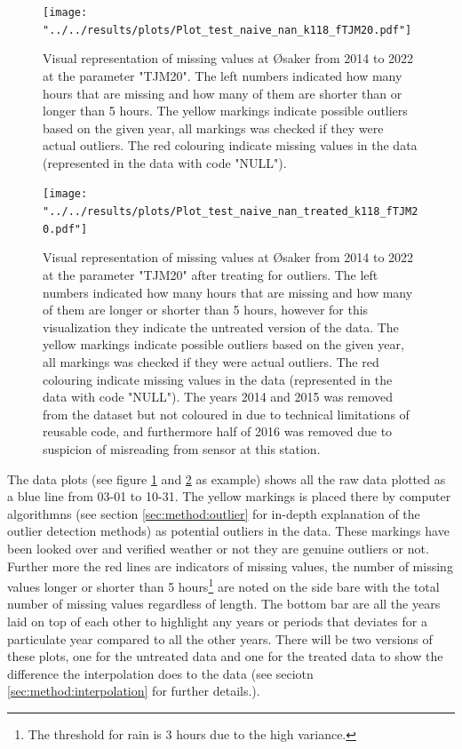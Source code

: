 \begin{figure}
		\centering
		\begin{adjustwidth}{-1in}{-1in}
			\texttt{[image: "../../results/plots/Plot\_test\_naive\_nan\_k118\_fTJM20.pdf"]}
		\end{adjustwidth}
		\caption[Visual representation of Øsaker untreated]{Visual representation of missing values at Øsaker from 2014 to 2022 at the parameter "TJM20". The left numbers indicated how many hours that are missing and how many of them are shorter than or longer than 5 hours. The yellow markings indicate possible outliers based on the given year, all markings was checked if they were actual outliers. The red colouring indicate missing values in the data (represented in the data with code "NULL").}
		\label{fig:plot-17}
\end{figure}
\begin{figure}
		\centering
		\begin{adjustwidth}{-1in}{-1in}
			\texttt{[image: "../../results/plots/Plot\_test\_naive\_nan\_treated\_k118\_fTJM20.pdf"]}
		\end{adjustwidth}
		\caption[Visual representation of Øsaker treated]{Visual representation of missing values at Øsaker from 2014 to 2022 at the parameter "TJM20" after treating for outliers. The left numbers indicated how many hours that are missing and how many of them are longer or shorter than 5 hours, however for this visualization they indicate the untreated version of the data. The yellow markings indicate possible outliers based on the given year, all markings was checked if they were actual outliers. The red colouring indicate missing values in the data (represented in the data with code "NULL"). The years 2014 and 2015 was removed from the dataset but not coloured in due to technical limitations of reusable code, and furthermore half of 2016 was removed due to suspicion of misreading from sensor at this station.}
		\label{fig:plot-17-treated}
\end{figure}

The data plots (see figure \ref{fig:plot-17} and \ref{fig:plot-17-treated} as example) shows all the raw data plotted as a blue line from 03-01 to 10-31. The yellow markings is placed there by computer algorithmns (see section \ref{sec:method:outlier} for in-depth explanation of the outlier detection methods) as potential outliers in the data. These markings have been looked over and verified weather or not they are genuine outliers or not. Further more the red lines are indicators of missing values, the number of missing values longer or shorter than 5 hours\footnote{The threshold for rain is 3 hours due to the high variance.} are noted on the side bare with the total number of missing values regardless of length. The bottom bar are all the years laid on top of each other to highlight any years or periods that deviates for a particulate year compared to all the other years. There will be two versions of these plots, one for the untreated data and one for the treated data to show the difference the interpolation does to the data (see seciotn \ref{sec:method:interpolation} for further details.).

